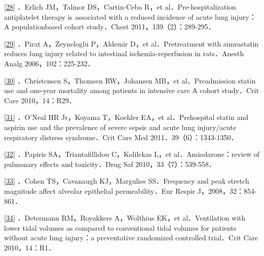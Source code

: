 \protect\hyperlink{text00011.htmlux5cux23ch28-10-back}{{[}28{]}}
．Erlich JM，Talmor DS，Cartin-Ceba R，et al．Pre-hospitalization
antiplatelet therapy is associated with a reduced incidence of acute
lung injury：A populationbased cohort study．Chest
2011，139（2）：289-295．

\protect\hyperlink{text00011.htmlux5cux23ch29-10-back}{{[}29{]}} ．Pirat
A，Zeyneloglu P，Aldemir D，et al．Pretreatment with simvastatin reduces
lung injury related to intestinal ischemia-reperfusion in rats．Anesth
Analg 2006，102：225-232．

\protect\hyperlink{text00011.htmlux5cux23ch30-10-back}{{[}30{]}}
．Christensen S，Thomsen RW，Johansen MB，et al．Preadmission statin use
and one-year mortality among patients in intensive care A cohort
study．Crit Care 2010，14：R29．

\protect\hyperlink{text00011.htmlux5cux23ch31-10-back}{{[}31{]}}
．O'Neal HR Jr，Koyama T，Koehler EA，et al．Prehospital statin and
aspirin use and the prevalence of severe sepsis and acute lung
injury/acute respiratory distress syndrome．Crit Care Med
2011．39（6）：1343-1350．

\protect\hyperlink{text00011.htmlux5cux23ch32-10-back}{{[}32{]}}
．Papiris SA，Triantafillidou C，Kolilekas L，et al．Amiodarone：review
of pulmonary effects and toxicity．Drug Saf 2010，33（7）：539-558．

\protect\hyperlink{text00011.htmlux5cux23ch33-10-back}{{[}33{]}} ．Cohen
TS，Cavanaugh KJ，Margulies SS．Frequency and peak stretch magnitude
affect alveolar epithelial permeability．Eur Respir
J，2008，32：854-861．

\protect\hyperlink{text00011.htmlux5cux23ch34-10-back}{{[}34{]}}
．Determann RM，Royakkers A，Wolthius EK，et al．Ventilation with lower
tidal volumes as compared to conventional tidal volumes for patients
without acute lung injury：a preventative randomized controlled
trial．Crit Care 2010，14：R1．

\protect\hypertarget{text00012.html}{}{}


